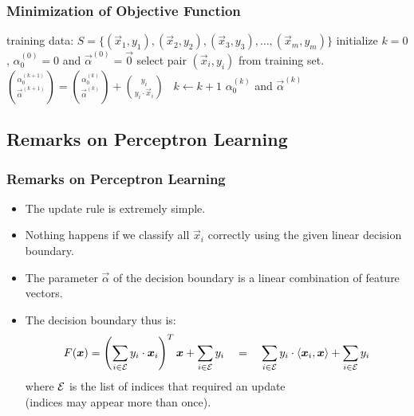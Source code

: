 \begin{frame}
  \frametitle{Minimization of Objective Function \cont}

  \begin{algorithmic}
    \STATE  {} training data:  $S = \{ (\vec x_1, y_1), (\vec x_2, y_2), (\vec x_3, y_3), \dots, (\vec x_m, y_m) \}$ \pause
    \STATE initialize  $k=0$, $\alpha^{(0)}_0=0$ and $\vec \alpha^{(0)}=  \vec 0$
    \REPEAT 
      \STATE select pair $(\vec x_i, y_i)$ from training set. \pause
        \STATE \
        \STATE $\displaystyle{ \alpha_0^{(k+1)} \choose \vec \alpha^{(k+1)}} =  { \alpha_0^{(k)} \choose \vec \alpha^{(k)}} +  {y_i \choose y_i\cdot \vec x_i}$
        \STATE \
        \STATE $k\leftarrow k+1$
      \ENDIF
      \pause
    \STATE {} $\alpha_0^{(k)}$ and $\vec \alpha^{(k)}$
  \end{algorithmic}
\end{frame}


\subsection{Remarks on Perceptron Learning}

\begin{frame}
  \frametitle{Remarks on Perceptron Learning}

  \begin{itemize}
    \item The update rule is extremely simple. \\[.3cm]
    \item Nothing happens if we classify all $\vec x_i$ correctly using the given linear decision boundary. \\[.3cm]
    \item The parameter $\vec \alpha$ of the decision boundary is a linear combination of feature vectors. \\[.3cm] \pause
    \item The decision boundary thus is:
    \begin{displaymath}
       F(\vec x) = \left (\sum_{i\in \cal E} y_i\cdot \vec x_i \right)^T \vec x + \sum_{i\in \cal E} y_i \quad 
                 = \quad \sum_{i\in \cal E} y_i\cdot \langle \vec x_i, \vec x\rangle + \sum_{i\in \cal E} y_i 
    \end{displaymath}
    where $\cal E$ is the list of indices that required an update \\
	(indices may appear more than once). 
  \end{itemize}
\end{frame}


